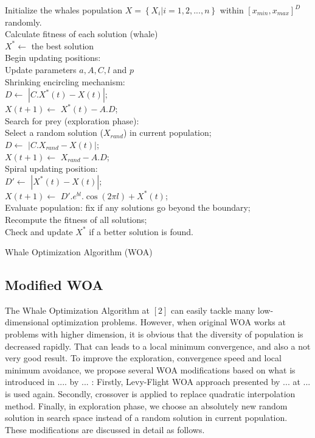 \documentclass[a4paper]{article}
\begin{document}
\begin{algorithm}[H]
\SetAlgoLined
 Initialize the whales population $X = \left\{X_i| i = 1, 2, ..., n\right\}$ within $[x_{min}, x_{max}]^D$ randomly. \\
 Calculate fitness of each solution (whale) \\
 $X^*\gets$ the best solution \\
 {
 	Begin updating positions: \\
 	{
		Update parameters $a, A, C, l$ and $p$ \\ 	
		{
			{
				Shrinking encircling mechanism:\\
				$D \gets$ $|C.X^*(t) - X(t)|$; \\
				$X(t+1) \gets$ $X^*(t) - A.D$; \\
			}
			{	
				Search for prey (exploration phase):\\
				Select a random solution ($X_{rand}$) in current population; \\
				$D \gets$ $|C.X_{rand} - X(t)|$; \\
				$X(t+1) \gets$ $X_{rand} - A.D$; \\
			 
			}
		}
		{
			Spiral updating position:\\
			$D' \gets$ $|X^*(t) - X(t)|$; \\
			$X(t+1) \gets$ $D'.e^{bl}.\cos(2\pi l) + X^*(t)$; \\
		} 	
 	}
 	Evaluate population: fix if any solutions go beyond the boundary;\\
 	Recompute the fitness of all solutions;\\
 	Check and update $X^*$ if a better solution is found. \\
}
 	
 \caption{Whale Optimization Algorithm (WOA)}
\end{algorithm}

\subsection{Modified WOA}
The Whale Optimization Algorithm at $[2]$ can easily tackle many low-dimensional optimization problems. However, when original WOA works at problems with higher dimension, it is obvious that the diversity of population is decreased rapidly. That can leads to a local minimum convergence, and also a not very good result. To improve the exploration, convergence speed and local minimum avoidance, we propose several WOA modifications based on what is introduced in .... by ... : Firstly, Levy-Flight WOA approach presented by ... at ... is used again. Secondly, crossover is applied to replace quadratic interpolation method. Finally, in exploration phase, we choose an absolutely new random solution in search space instead of a random solution in current population. These modifications are discussed in detail as follows.
\end{document}

